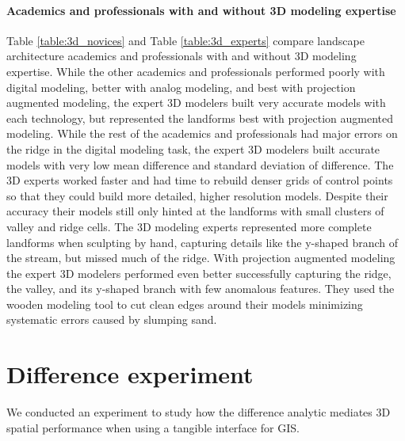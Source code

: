 \documentclass[prodmode,acmtochi]{acmsmall} %
\begin{document}
\paragraph{Academics and professionals with and without 3D modeling expertise}
%
Table \ref{table:3d_novices} and Table \ref{table:3d_experts}
compare landscape architecture academics and professionals 
with and without 3D modeling expertise. 
While the other academics and professionals
performed poorly with digital modeling, 
better with analog modeling, 
and best with projection augmented modeling,
the expert 3D modelers built very accurate models
with each technology, but represented the landforms
best with projection augmented modeling.
While the rest of the academics and professionals 
had major errors on the ridge 
in the digital modeling task,
the expert 3D modelers built accurate models 
with very low mean difference and 
standard deviation of difference. 
The 3D experts worked faster
and had time to rebuild denser grids of control points
so that they could build more detailed,
higher resolution models.
Despite their accuracy their models 
still only hinted at the landforms 
with small clusters of valley and ridge cells. 
The 3D modeling experts represented 
more complete landforms when sculpting by hand,
capturing details like the y-shaped branch of the stream,
but missed much of the ridge. 
With projection augmented modeling 
the expert 3D modelers performed even better
successfully capturing
the ridge, the valley, and its y-shaped branch
with few anomalous features. 
%
They used the wooden modeling tool 
to cut clean edges around their models
minimizing systematic errors caused by slumping sand.

\section{Difference experiment}
We conducted an experiment to study 
how the difference analytic mediates 3D spatial performance 
when using a tangible interface for GIS.

\end{document}
